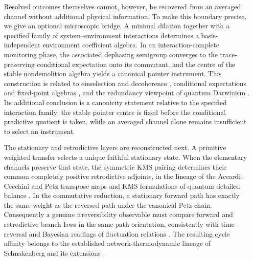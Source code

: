\documentclass[11pt]{article}
\theoremstyle{definition}
\theoremstyle{remark}
\begin{document}
Resolved outcomes themselves cannot, however, be recovered from an averaged
channel without additional physical information.  To make this boundary
precise, we give an optional microscopic bridge.  A minimal dilation together
with a specified family of system--environment interactions determines a
basis-independent environment coefficient algebra.  In an
interaction-complete monitoring phase, the associated dephasing semigroup
converges to the trace-preserving conditional expectation onto its commutant,
and the centre of the stable nondemolition algebra yields a canonical pointer
instrument.  This construction is related to einselection and decoherence
\cite{Zurek1981,Zurek2003,Schlosshauer2004}, conditional expectations and
fixed-point algebras
\cite{BlanchardOlkiewicz2003,Evans1977,FrigerioVerri1982,FagnolaSassoUmanita2019,TicozziViola2008},
and the redundancy viewpoint of quantum Darwinism
\cite{BlumeKohoutZurek2006}.  Its additional conclusion is a canonicity
statement relative to the specified interaction family: the stable pointer
centre is fixed before the conditional predictive quotient is taken, while an
averaged channel alone remains insufficient to select an instrument.

The stationary and retrodictive layers are reconstructed next.  A primitive
weighted transfer selects a unique faithful stationary state.  When the
elementary channels preserve that state, the symmetric KMS pairing determines
their common completely positive retrodictive adjoints, in the lineage of the
Accardi--Cecchini and Petz transpose maps
\cite{AccardiCecchini1982,Petz1986,Petz2003} and KMS formulations of quantum
detailed balance
\cite{Alicki1976,KFGV1977,GoldsteinLindsay1995,FagnolaUmanita2010}.  In the
commutative reduction, a stationary forward path has exactly the same weight
as the reversed path under the canonical Petz chain.  Consequently a genuine
irreversibility observable must compare forward and retrodictive branch laws
in the same path orientation, consistently with time-reversal and Bayesian
readings of fluctuation relations \cite{Crooks2008,BuscemiScarani2021}.  The
resulting cycle affinity belongs to the established network-thermodynamic
lineage of Schnakenberg and its extensions
\cite{Schnakenberg1976,LebowitzSpohn1999,AndrieuxGaspard2007}.
\end{document}
